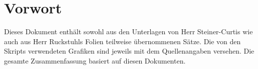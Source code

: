 %
%
%
%


\newcommand{\titleinfo}{Applied Statistics - Zusammenfassung}
\newcommand{\authorinfo}{J. Perdrizat}  %
\newcommand{\versioninfo}{$Revision: 1 $ - powered by \LaTeX}

%








 


\small %
\tableofcontents
\section{Vorwort}
Dieses Dokument enthält sowohl aus den Unterlagen von Herr Steiner-Curtis \cite{C:SteinerCurtis} wie auch aus Herr Ruckstuhls Folien \cite{C:Ruckstuhl} teilweise übernommenen Sätze. Die von den Skripts verwendeten Grafiken sind jeweils mit dem Quellenangaben versehen. Die gesamte Zusammenfassung basiert auf diesen Dokumenten. 
\newpage







\clearpage
\printbibliography

